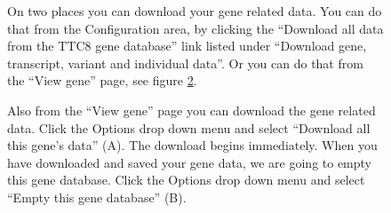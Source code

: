 \begin{figure}[ht]
  \begin{shaded}
	  \caption{On two places you can download your gene related data.
	  You can do that from the Configuration area, 
	   by clicking the ``Download all data from the TTC8 gene database'' link listed under ``Download gene, 
	   transcript, variant and individual data''.
	  Or you can do that from the ``View gene'' page, see figure \ref{fig:export_II}. }
		\label{fig:export_I}
  \end{shaded}
\end{figure}

\begin{figure}[ht]
  \begin{shaded}
	  \caption{Also from the ``View gene'' page you can download the gene related data. 
	  Click the Options drop down menu and select ``Download all this gene's data'' (A).
	  The download begins immediately.\newline
	  When you have downloaded and saved your gene data, we are going to empty this gene database.
	  Click the Options drop down menu and select ``Empty this gene database'' (B).}
		\label{fig:export_II}
  \end{shaded}
\end{figure}

